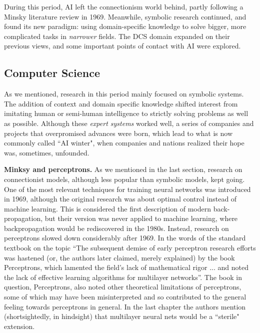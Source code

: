 \documentclass[../main.tex]{subfiles}
\begin{document}
During this period, AI left the connectionism world behind, partly following a Minsky literature review in 1969. Meanwhile, symbolic research continued, and found its new paradigm: using domain-specific knowledge to solve bigger, more complicated tasks in \textit{narrower} fields. The DCS domain expanded on their previous views, and some important points of contact with AI were explored.

\subsection{Computer Science}
As we mentioned, research in this period mainly focused on symbolic systems. The addition of context and domain specific knowledge shifted interest from imitating human or semi-human intelligence to strictly solving problems as well as possible. Although these \textit{expert systems} worked well, a series of companies and projects that overpromised advances were born, which lead to what is now commonly called ``AI winter", when companies and nations realized their hope was, sometimes, unfounded.

\vspace{4pt}
\textbf{Minksy and perceptrons.}
As we mentioned in the last section, research on connectionist models, although less popular than symbolic models, kept going. One of the most relevant techniques for training neural networks was introduced in 1969\cite{brysonAppliedOptimalControl1969}, although the original research was about optimal control instead of machine learning. This is considered the first description of modern back-propagation\cite{lecunTheoreticalFrameworkBackpropagation1988}, but their version was never applied to machine learning, where backpropagation would be rediscovered in the 1980s.
Instead, research on perceptrons slowed down considerably after 1969. In the words of the standard textbook on the topic \enquote{The subsequent demise of early perceptron research efforts was hastened (or, the authors later claimed, merely explained) by the book Perceptrons, which lamented the field's lack of mathematical rigor ... and noted the lack of effective learning algorithms for multilayer networks}. The book in question, Perceptrons\cite{minskyPerceptronIntroductionComputational1969}, also noted other theoretical limitations of perceptrons, some of which may have been misinterpreted and so contributed to the general feeling towards perceptrons in general. In the last chapter the authors mention (shortsightedly, in hindsight) that multilayer neural nets would be a ``sterile" extension.
\end{document}
